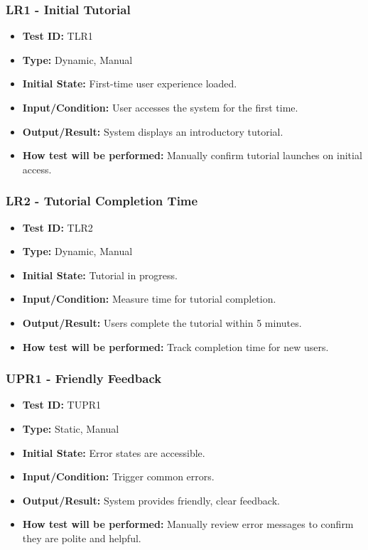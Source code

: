 \documentclass[12pt, titlepage]{article}
\begin{document}
\subsubsection{LR1 - Initial Tutorial}
\begin{itemize}
    \item \textbf{Test ID:} TLR1
    \item \textbf{Type:} Dynamic, Manual
    \item \textbf{Initial State:} First-time user experience loaded.
    \item \textbf{Input/Condition:} User accesses the system for the first time.
    \item \textbf{Output/Result:} System displays an introductory tutorial.
    \item \textbf{How test will be performed:} Manually confirm tutorial launches on initial access.
\end{itemize}

\subsubsection{LR2 - Tutorial Completion Time}
\begin{itemize}
    \item \textbf{Test ID:} TLR2
    \item \textbf{Type:} Dynamic, Manual
    \item \textbf{Initial State:} Tutorial in progress.
    \item \textbf{Input/Condition:} Measure time for tutorial completion.
    \item \textbf{Output/Result:} Users complete the tutorial within 5 minutes.
    \item \textbf{How test will be performed:} Track completion time for new users.
\end{itemize}

\subsubsection{UPR1 - Friendly Feedback}
\begin{itemize}
    \item \textbf{Test ID:} TUPR1
    \item \textbf{Type:} Static, Manual
    \item \textbf{Initial State:} Error states are accessible.
    \item \textbf{Input/Condition:} Trigger common errors.
    \item \textbf{Output/Result:} System provides friendly, clear feedback.
    \item \textbf{How test will be performed:} Manually review error messages to confirm they are polite and helpful.
\end{itemize}
\end{document}
